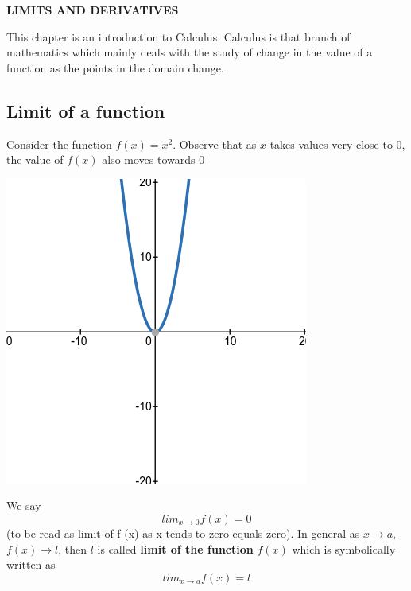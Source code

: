 \documentclass[12pt]{article}
\begin{document}
\begin{center}
    {\LARGE \textbf{LIMITS AND DERIVATIVES} }
\end{center}


This chapter is an introduction to Calculus. Calculus is that branch of mathematics which mainly deals with the study of change in the value of a function as the points in the domain change.

\subsection*{Limit of a function}
Consider the function $f(x) = x^2.$ Observe that as $x$ takes values very close to $0$,
the value of $f(x)$ also moves towards $0$
\begin{center}
    

\includegraphics*[scale=0.3]{1.png}
\end{center}
We say 
$$lim _{x \rightarrow 0} f(x)=0$$
(to be read as limit of f (x) as x tends to zero equals zero).
In general as $x \rightarrow a$, $f (x) \rightarrow l$, then $l$ is called \textbf{limit of the function} $f (x)$ which is
symbolically written as 
$$lim_{x \rightarrow a} f(x)=l$$
\end{document}
